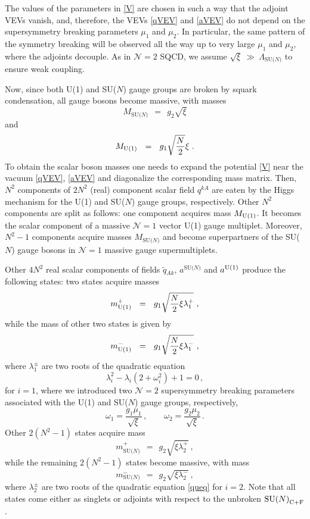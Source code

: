 \documentclass[12pt]{article}
\def\beq{\begin{equation}}
\def\eeq{\end{equation}}
\newcommand{\ntwo}{${\mathcal N}=2$ }
\newcommand{\none}{${\mathcal N}=1$ }
\newcommand{\wt}{\widetilde}
\newcommand{\LN}{\Lambda_\text{SU($N$)}}
\def\cfl {$\text{SU($N$)}_{\rm C+F}$ }
\newcommand{\mUp}{m_{\rm U(1)}^{+}}
\newcommand{\mUm}{m_{\rm U(1)}^{-}}
\newcommand{\mNp}{m_\text{SU($N$)}^{+}}
\newcommand{\mNm}{m_\text{SU($N$)}^{-}}
\newcommand{\aU}{a^{\rm U(1)}}
\newcommand{\aN}{a^\text{SU($N$)}}
\newcommand{\MN}{M_\text{SU($N$)}}
\newcommand{\MU}{M_{\rm U(1)}}
\begin{document}
The values of the parameters in \eqref{V} are chosen in such a way that the adjoint VEVs vanish, 
	and, therefore, the VEVs \eqref{qVEV} and \eqref{aVEV} do not depend on the supersymmetry breaking
	parameters $ \mu_1 $ and $ \mu_2 $.
	In particular, the same pattern of the symmetry breaking will be observed all the way up to
	very large $ \mu_1 $ and $ \mu_2 $, where the adjoints decouple.
	As in \ntwo SQCD, we assume $ \sqrt{\xi} ~\gg~ \LN $ to ensure weak coupling.

	Now, since both U(1) and SU($N$) gauge groups are broken by squark condensation, all gauge bosons
	become massive, with masses 
\beq
\label{MN}
	\MN ~~=~~ g_2\sqrt{\xi}
\eeq
	and
\beq
\label{MU}
	\MU ~~=~~ g_1 \sqrt{\frac{N}{2}} \xi~.
\eeq
	To obtain the scalar boson masses one needs to expand the potential \eqref{V} near 
	the vacuum \eqref{qVEV}, \eqref{aVEV} and diagonalize the corresponding mass matrix.
	Then, $ N^2 $ components of $2N^2$ (real) component scalar field $ q^{kA} $ are eaten by the
	Higgs mechanism for the U(1) and SU($N$) gauge groups, respectively. 
	Other $ N^2 $ components are split as follows: one component acquires mass $ \MU $.
	It becomes the scalar component of a massive \none vector U(1) gauge multiplet.
	Moreover, $ N^2 - 1 $ components acquire masses $ \MN $ and become superpartners of the
	SU($N$) gauge bosons in \none  massive gauge supermultiplets.
	
	Other $ 4 N^2 $ real scalar components of fields $ \wt{q}{}_{Ak} $, $\aN$ and $\aU$ produce the
	following states: 
	two states acquire masses
\beq
\label{mUp}
	\mUp ~~=~~ g_1 \sqrt{\frac{N}{2}\xi\lambda_1^+}~,
\eeq
	while the mass of other two states is given by
\beq
\label{mUm}
	\mUm ~~=~~ g_1 \sqrt{\frac{N}{2}\xi\lambda_1^-}~,
\eeq
	where $ \lambda_1^\pm $ are two roots of the quadratic equation
\beq
	\lambda_i^2  -  \lambda_i(2 + \omega^2_i)  +   1  =  0\,,
\label{queq}
\eeq
	for $i =1$, where we introduced two \ntwo supersymmetry breaking parameters associated
	with the U(1) and SU($N$) gauge groups, respectively,
\beq
	\omega_1  =  \frac{g_1\mu_1}{\sqrt{\xi}}\,,\qquad
	\omega_2  =  \frac{g_2\mu_2}{\sqrt{\xi}}\,.
\label{omega}
\eeq
	Other $ 2(N^2 - 1) $ states acquire mass
\beq
\label{mNp}
	\mNp ~~=~~ g_2 \sqrt{\xi\lambda_2^+} ~,
\eeq
	while the remaining $ 2(N^2 - 1) $ states become massive, with mass
\beq
\label{mNm}
	\mNm ~~=~~ g_2 \sqrt{\xi\lambda_2^-} ~,
\eeq
	where $ \lambda_2^\pm $ are two roots of the quadratic equation \eqref{queq} for $ i = 2 $.
	Note that all states come either as singlets or adjoints with respect to the unbroken
	\cfl.
\end{document}
